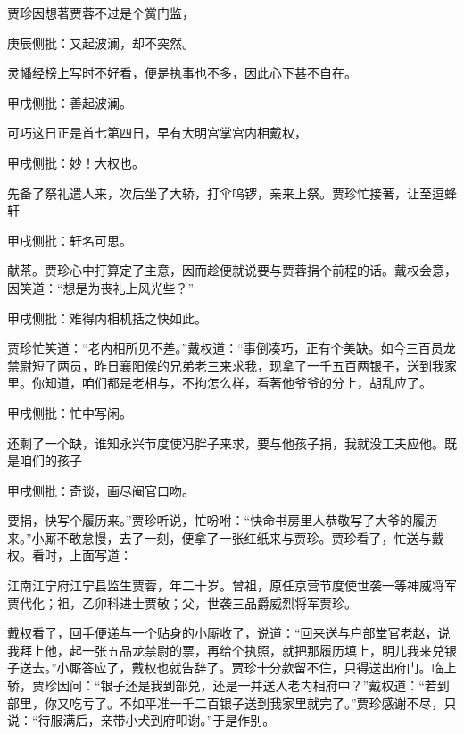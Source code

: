 \begin{parag}
    贾珍因想著贾蓉不过是个黉门监，\begin{note}庚辰侧批：又起波澜，却不突然。\end{note}灵幡经榜上写时不好看，便是执事也不多，因此心下甚不自在。\begin{note}甲戌侧批：善起波澜。\end{note}可巧这日正是首七第四日，早有大明宫掌宫内相戴权，\begin{note}甲戌侧批：妙！大权也。\end{note}先备了祭礼遣人来，次后坐了大轿，打伞呜锣，亲来上祭。贾珍忙接著，让至逗蜂轩\begin{note}甲戌侧批：轩名可思。\end{note}献茶。贾珍心中打算定了主意，因而趁便就说要与贾蓉捐个前程的话。戴权会意，因笑道：“想是为丧礼上风光些？”\begin{note}甲戌侧批：难得内相机括之快如此。\end{note}贾珍忙笑道：“老内相所见不差。”戴权道：“事倒凑巧，正有个美缺。如今三百员龙禁尉短了两员，昨日襄阳侯的兄弟老三来求我，现拿了一千五百两银子，送到我家里。你知道，咱们都是老相与，不拘怎么样，看著他爷爷的分上，胡乱应了。\begin{note}甲戌侧批：忙中写闲。\end{note}还剩了一个缺，谁知永兴节度使冯胖子来求，要与他孩子捐，我就没工夫应他。既是咱们的孩子\begin{note}甲戌侧批：奇谈，画尽阉官口吻。\end{note}要捐，快写个履历来。”贾珍听说，忙吩咐：“快命书房里人恭敬写了大爷的履历来。”小厮不敢怠慢，去了一刻，便拿了一张红纸来与贾珍。贾珍看了，忙送与戴权。看时，上面写道：
\end{parag}

\begin{qute2sp}
    江南江宁府江宁县监生贾蓉，年二十岁。曾祖，原任京营节度使世袭一等神威将军贾代化；祖，乙卯科进士贾敬；父，世袭三品爵威烈将军贾珍。
\end{qute2sp}

\begin{parag}
    戴权看了，回手便递与一个贴身的小厮收了，说道：“回来送与户部堂官老赵，说我拜上他，起一张五品龙禁尉的票，再给个执照，就把那履历填上，明儿我来兑银子送去。”小厮答应了，戴权也就告辞了。贾珍十分款留不住，只得送出府门。临上轿，贾珍因问：“银子还是我到部兑，还是一并送入老内相府中？”戴权道：“若到部里，你又吃亏了。不如平准一千二百银子送到我家里就完了。”贾珍感谢不尽，只说：“待服满后，亲带小犬到府叩谢。”于是作别。
\end{parag}



